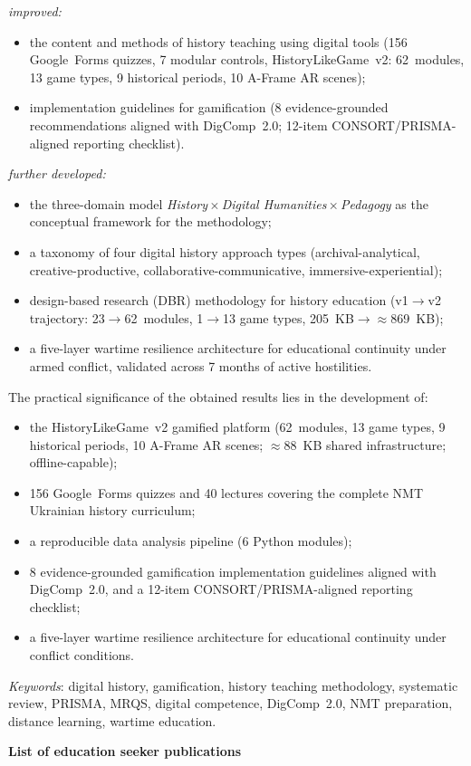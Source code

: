 {{\textit{improved:}
\begin{itemize}
\item the content and methods of history teaching using digital tools
  (156 Google~Forms quizzes, 7 modular controls, HistoryLikeGame~v2:
  62~modules, 13 game types, 9 historical periods, 10 A-Frame AR scenes);
\item implementation guidelines for gamification (8 evidence-grounded
  recommendations aligned with DigComp~2.0; 12-item CONSORT/PRISMA-aligned
  reporting checklist).
\end{itemize}
\textit{further developed:}
\begin{itemize}
\item the three-domain model \textit{History\,$\times$\,Digital
  Humanities\,$\times$\,Pedagogy} as the conceptual framework for the
  methodology;
\item a taxonomy of four digital history approach types
  (archival-analytical, creative-productive, collaborative-communicative,
  immersive-experiential);
\item design-based research (DBR) methodology for history education
  (v1$\to$v2 trajectory: 23$\to$62~modules, 1$\to$13 game types,
  205~KB$\to$$\approx$869~KB);
\item a five-layer wartime resilience architecture for educational
  continuity under armed conflict, validated across 7 months of active
  hostilities.
\end{itemize}

The practical significance of the obtained results lies in the development of:
\begin{itemize}
\item the HistoryLikeGame~v2 gamified platform (62~modules, 13 game types,
  9 historical periods, 10 A-Frame AR scenes; $\approx$88~KB shared
  infrastructure; offline-capable);
\item 156 Google~Forms quizzes and 40 lectures covering the complete NMT
  Ukrainian history curriculum;
\item a reproducible data analysis pipeline (6 Python modules);
\item 8 evidence-grounded gamification implementation guidelines aligned with
  DigComp~2.0, and a 12-item CONSORT/PRISMA-aligned reporting checklist;
\item a five-layer wartime resilience architecture for educational
  continuity under conflict conditions.
\end{itemize}

\textit{Keywords}: digital history, gamification, history teaching methodology, systematic review, PRISMA, MRQS, digital competence, DigComp~2.0, NMT preparation, distance learning, wartime education.}


\begin{center}
    \textbf{List of education seeker publications}
\end{center}


\printpratsi

} %
